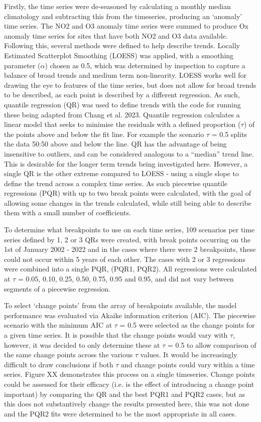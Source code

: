 \documentclass[journal abbreviation, manuscript]{copernicus}
\begin{document}
Firstly, the time series were de-seasoned by calculating a monthly median climatology and subtracting this from the timeseries, producing an ‘anomaly’ time series. The NO2 and O3 anomaly time series were summed to produce Ox anomaly time series for sites that have both NO2 and O3 data available. Following this, several methods were defined to help describe trends. Locally Estimated Scatterplot Smoothing (LOESS) was applied, with a smoothing parameter ($\alpha$) chosen as 0.5, which was determined by inspection to capture a balance of broad trends and medium term non-linearity. LOESS works well for drawing the eye to features of the time series, but does not allow for broad trends to be described, as each point is described by a different regression. As such, quantile regression (QR) was used to define trends with the code for running these being adapted from Chang et al. 2023. Quantile regression calculates a linear model that seeks to minimise the residuals with a defined proportion ($\tau$) of the points above and below the fit line. For example the scenario $\tau$ = 0.5 splits the data 50:50 above and below the line. QR has the advantage of being insensitive to outliers, and can be considered analogous to a “median” trend line. This is desirable for the longer term trends being investigated here. However, a single QR is the other extreme compared to LOESS - using a single slope to define the trend across a complex time series. As such piecewise quantile regressions (PQR) with up to two break points were calculated, with the goal of allowing some changes in the trends calculated, while still being able to describe them with a small number of coefficients.

To determine what breakpoints to use on each time series, 109 scenarios per time series defined by 1, 2 or 3 QRs were created, with break points occurring on the 1st of January 2002 - 2022 and in the cases where there were 2 breakpoints, these could not occur within 5 years of each other. The cases with 2 or 3 regressions were combined into a single PQR, (PQR1, PQR2). All regressions were calculated at $\tau$ = 0.05, 0.10, 0.25, 0.50, 0.75, 0.95 and 0.95, and did not vary between segments of a piecewise regression.

To select ‘change points’ from the array of breakpoints available, the model performance was evaluated via Akaike information criterion (AIC). The piecewise scenario with the minimum AIC at $\tau$ = 0.5 were selected as the change points for a given time series. It is possible that the change points would vary with $\tau$, however, it was decided to only determine these at $\tau$ = 0.5 to allow comparison of the same change points across the various $\tau$ values. It would be increasingly difficult to draw conclusions if both $\tau$ and change points could vary within a time series.  Figure XX demonstrates this process on a single timeseries. Change points could be assessed for their efficacy (i.e. is the effect of introducing a change point important) by comparing the QR and the best PQR1 and PQR2 cases, but as this does not substantively change the results presented here, this was not done and the PQR2 fits were determined to be the most appropriate in all cases.
\end{document}
